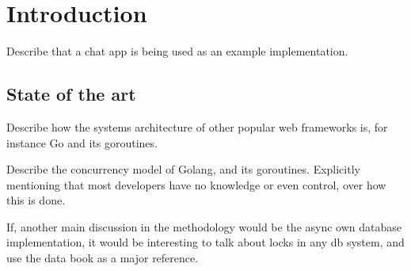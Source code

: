 \section{Introduction}
Describe that a chat app is being used as an example implementation.
\subsection{State of the art}
Describe how the systems architecture of other popular web frameworks is, for instance Go and its goroutines.

Describe the concurrency model of Golang, and its goroutines. Explicitly mentioning that most developers have no knowledge or even control, over how this is done.

If, another main discussion in the methodology would be the async own database implementation, it would be interesting to talk about locks in any db system, and use the data book as a major reference.
